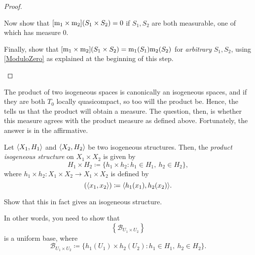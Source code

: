 \begin{thm}
\begin{proof}
\begin{exr}
Now show that $[\mathrm{m} _1\times \mathrm{m} _2](S_1\times S_2)=0$ if $S_1,S_2$ are both measurable, one of which has measure $0$.
\end{exr}

\begin{exr}
Finally, show that $[\mathrm{m} _1\times \mathrm{m} _2](S_1\times S_2)=\mathrm{m} _1(S_1)\mathrm{m} _2(S_2)$ for \emph{arbitrary} $S_1,S_2$, using \cref{ModuloZero} as explained at the beginning of this step.
\end{exr}
\end{proof}
\end{thm}

The product of two isogeneous spaces is canonically an isogeneous spaces, and if they are both $T_0$ locally quasicompact, so too will the product be.  Hence, the  tells us that the product will obtain a measure.  The question, then, is whether this measure agrees with the product measure as defined above.  Fortunately, the answer is in the affirmative.
\begin{dfn}
Let $\langle X_1,H_1\rangle$ and $\langle X_2,H_2\rangle$ be two isogeneous structures.  Then, the \emph{product isogeneous structure} on $X_1\times X_2$ is given by
\begin{equation}
H_1\times H_2\coloneqq \{ h_1\times h_2:h_1\in H_1,\ h_2\in H_2\},
\end{equation}
where $h_1\times h_2:X_1\times X_2\rightarrow X_1\times X_2$ is defined by
\begin{equation}
[h_1\times h_2](\coord{x_1,x_2})\coloneqq \coord{h_1(x_1),h_2(x_2)}.
\end{equation}
\begin{exr}
Show that this in fact gives an isogeneous structure.
\begin{rmk}
In other words, you need to show that
\begin{equation}
\left\{ \mathcal{B}_{U_1\times U_2}\right\} 
\end{equation}
is a uniform base, where
\begin{equation}
\mathcal{B}_{U_1\times U_2}\coloneqq \{ h_1(U_1)\times h_2(U_2):h_1\in H_1,\ h_2\in H_2\} .
\end{equation}
\end{rmk}
\end{exr}
\end{dfn}
